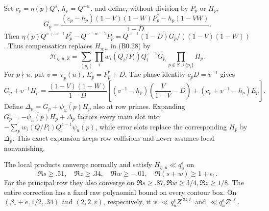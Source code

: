\documentclass[11pt,a4paper]{article}
\begin{document}
Set \(c_p=\overline{\eta(p)}Q^s\), \(h_p=Q^{-w}\), and define, without
division by \(P_p\) or \(H_p\), \[
G_p=\frac{(c_p-h_p)(1-V)(1-W)P_p^*-h_p(1-VW)}{1-D}.
\tag{B0.31}
\] Then
\(\overline{\eta(p)}Q^{s+z-1}P_p^*-Q^{z-w-1}P_p =Q^{z-1}(1-D)G_p/((1-V)(1-W))\).
Thus compensation replaces \(H_{\eta,\allowbreak{}u}\) in (B0.28) by \[
\mathcal H_{\eta,u,Z}=\sum_{(p_i)}\prod_iw_i(Q_i/P_i)Q_i^{z-1}G_{p_i}
\prod_{p\notin S\cup\{p_i\}}H_p.
\tag{B0.32}
\] For \(p\nmid u\), put \(v=\chi_p(u)\), \(E_p=P_p^*+D\). The phase
identity \(c_pD=v^{-1}\) gives \[
G_p+v^{-1}H_p=\frac{(1-V)(1-W)}{1-D}
\left[(v^{-1}-h_p)\left(\frac V{1-V}-D\right)
+(c_p+v^{-1}-h_p)E_p\right].
\tag{B0.33}
\] Define \(\Delta_p=G_p+\overline{\psi_u(p)}H_p\) also at row primes.
Expanding \(G_p=-\overline{\psi_u(p)}H_p+\Delta_p\) factors every main
slot into \(-\sum_pw_i(Q/P_i)Q^{z-1}\overline{\psi_u(p)}\), while error
slots replace the corresponding \(H_p\) by \(\Delta_p\). This exact
expansion keeps row collisions and never assumes local nonvanishing.

The local products converge normally and satisfy
\(H_{\eta,\allowbreak{}u}\ll q_u^\epsilon\) on \[
\Re s\ge.51,\quad\Re z\ge.34,\quad\Re w\ge-.01,\quad\Re(s+w)\ge1+\epsilon_1.
\tag{B0.34}
\] For the principal row they also converge on
\(\Re s\ge.87,\allowbreak{}\Re w\ge3/4,\allowbreak{}\Re z\ge1/8\). The entire correction has a
fixed raw polynomial bound on every contour box. On
\((\beta_*+e,\allowbreak{}1/2,\allowbreak{}.34)\) and \((2,\allowbreak{}2,\allowbreak{}v)\), respectively, it is
\(\ll q_u^\epsilon Z^{.34\ell}\) and \(\ll q_u^\epsilon Z^{v\ell}\).
\end{document}
